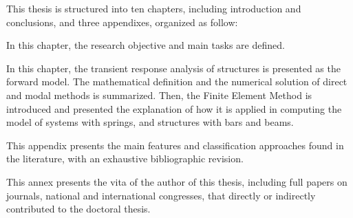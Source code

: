 This thesis is structured into ten chapters, including introduction and conclusions, and three appendixes, organized as follow:

\begin{description}[style=sameline,labelindent=1cm]
\item [\fullref{chp:1} (this chapter)] In this chapter, the research objective and main tasks are defined.
\item [\fullref{chp:3}] 
\item [\fullref{chp:4}] In this chapter, the transient response analysis of structures is presented as the forward model. The mathematical definition and the numerical solution of direct and modal methods is summarized. Then, the Finite Element Method is introduced and presented the explanation of how it is applied in computing the model of systems with springs, and structures with bars and beams.
\item [\fullref{chp:5}]
\item [\fullref{chp:6}]
\item [\fullref{chp:7}]
\item [\fullref{chp:8}]
\item [\fullref{chp:10}]
\item [References]
\item [\fullref{app:A}] This appendix presents the main features and classification approaches found in the literature, with an exhaustive bibliographic revision.
\item [\fullref{vita}] This annex presents the vita of the author of this thesis, including full papers on journals, national and international congresses, that directly or indirectly contributed to the doctoral thesis.

\end{description}

